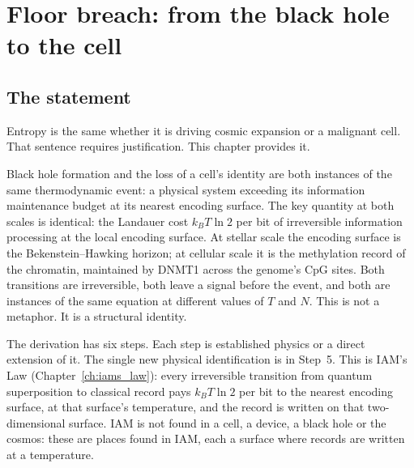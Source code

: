 \chapter{Floor breach: from the black hole to the cell}\label{ch:surfaces}

\section*{The statement}
Entropy is the same whether it is driving cosmic expansion or a malignant cell. That sentence requires justification. This chapter provides it.

Black hole formation and the loss of a cell's identity are both instances of the same thermodynamic event: a physical system exceeding its
information maintenance budget at its nearest encoding surface. The key quantity at both scales is identical: the Landauer cost $k_BT\ln2$ per bit
of irreversible information processing at the local encoding surface. At stellar scale the encoding surface is the Bekenstein--Hawking horizon; at
cellular scale it is the methylation record of the chromatin, maintained by DNMT1 across the genome's CpG sites. Both transitions are
irreversible, both leave a signal before the event, and both are instances of the same equation at different values of $T$ and $N$. This is not a
metaphor. It is a structural identity. \conjecture

\begin{center}\end{center}

The derivation has six steps. Each step is established physics or a direct extension of it. The single new physical identification is in Step~5.
This is IAM's Law (Chapter~\ref{ch:iams_law}): every irreversible transition from quantum superposition to classical record pays $k_BT\ln2$ per bit to the
nearest encoding surface, at that surface's temperature, and the record is written on that two-dimensional surface. IAM is not found in a cell, a
device, a black hole or the cosmos: these are places found in IAM, each a surface where records are written at a temperature.

